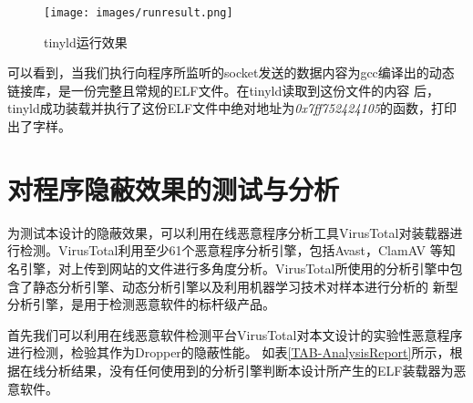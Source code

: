 \begin{figure}[h]
    \centering
    \texttt{[image: images/runresult.png]}
    \caption{tinyld运行效果}
    \label{FIG-runresult}
\end{figure}

可以看到，当我们执行向程序所监听的socket发送的数据内容为gcc编译出的动态链接库，是一份完整且常规的ELF文件。在tinyld读取到这份文件的内容
后，tinyld成功装载并执行了这份ELF文件中绝对地址为\textit{0x7ff752424105}的函数，打印出了字样。

\section{对程序隐蔽效果的测试与分析}

为测试本设计的隐蔽效果，可以利用在线恶意程序分析工具VirusTotal对装载器进行检测。VirusTotal利用至少61个恶意程序分析引擎，包括Avast，ClamAV
等知名引擎，对上传到网站的文件进行多角度分析。VirusTotal所使用的分析引擎中包含了静态分析引擎、动态分析引擎以及利用机器学习技术对样本进行分析的
新型分析引擎，是用于检测恶意软件的标杆级产品。

首先我们可以利用在线恶意软件检测平台VirusTotal对本文设计的实验性恶意程序进行检测，检验其作为Dropper的隐蔽性能。
如表\ref{TAB-AnalysisReport}所示，根据在线分析结果，没有任何使用到的分析引擎判断本设计所产生的ELF装载器为恶意软件。

